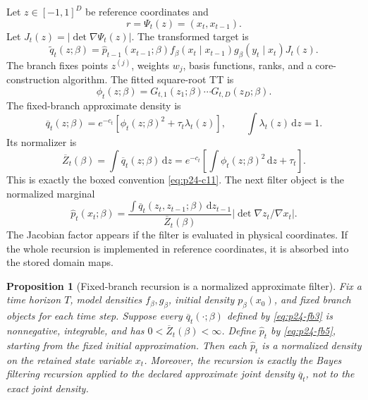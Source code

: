 \documentclass[11pt]{article}
\newtheorem{proposition}{Proposition}
\numberwithin{equation}{section}
\newcommand{\dd}{\,\mathrm d}
\begin{document}
Let \(z\in[-1,1]^D\) be reference coordinates and
\[
    r=\Psi_t(z)=(x_t,x_{t-1}).
\]
Let \(J_t(z)=|\det\nabla\Psi_t(z)|\).  The transformed target is
\begin{equation}
    \widetilde q_t(z;\beta)
    =
    \widehat p_{t-1}(x_{t-1};\beta)
    f_\beta(x_t\mid x_{t-1})
    g_\beta(y_t\mid x_t)
    J_t(z).
    \label{eq:p24-fb1}
\end{equation}
The branch fixes points \(z^{(j)}\), weights \(w_j\), basis functions, ranks,
and a core-construction algorithm.  The fitted square-root TT is
\begin{equation}
    \phi_t(z;\beta)=G_{t,1}(z_1;\beta)\cdots G_{t,D}(z_D;\beta).
    \label{eq:p24-fb2}
\end{equation}
The fixed-branch approximate density is
\begin{equation}
    \overline q_t(z;\beta)
    =
    e^{-c_t}\left[\phi_t(z;\beta)^2+\tau_t\lambda_t(z)\right],
    \qquad
    \int\lambda_t(z)\dd z=1.
    \label{eq:p24-fb3}
\end{equation}
Its normalizer is
\begin{equation}
    \overline Z_t(\beta)
    =
    \int\overline q_t(z;\beta)\dd z
    =
    e^{-c_t}\left[\int\phi_t(z;\beta)^2\dd z+\tau_t\right].
    \label{eq:p24-fb4}
\end{equation}
This is exactly the boxed convention \eqref{eq:p24-c11}.
The next filter object is the normalized marginal
\begin{equation}
    \widehat p_t(x_t;\beta)
    =
    \frac{
    \int \overline q_t(z_t,z_{t-1};\beta)\dd z_{t-1}}
    {\overline Z_t(\beta)}
    \left|\det\nabla z_t/\nabla x_t\right|.
    \label{eq:p24-fb5}
\end{equation}
The Jacobian factor appears if the filter is evaluated in physical coordinates.
If the whole recursion is implemented in reference coordinates, it is absorbed
into the stored domain maps.

\begin{proposition}[Fixed-branch recursion is a normalized approximate filter]
Fix a time horizon \(T\), model densities \(f_\beta,g_\beta\), initial density
\(p_\beta(x_0)\), and fixed branch objects for each time step.  Suppose every
\(\overline q_t(\cdot;\beta)\) defined by \eqref{eq:p24-fb3} is nonnegative, integrable, and
has \(0<\overline Z_t(\beta)<\infty\).  Define \(\widehat p_t\) by \eqref{eq:p24-fb5},
starting from the fixed initial approximation.  Then each \(\widehat p_t\) is a
normalized density on the retained state variable \(x_t\).  Moreover, the
recursion is exactly the Bayes filtering recursion applied to the declared
approximate joint density \(\overline q_t\), not to the exact joint density.
\end{proposition}
\end{document}
